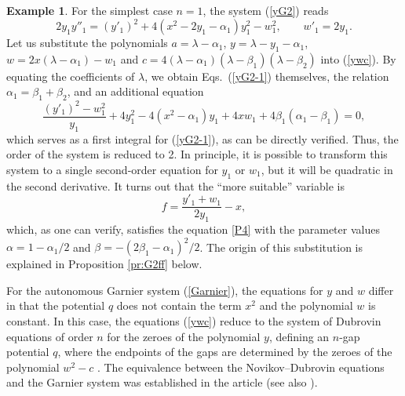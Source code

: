 \documentclass[11pt]{article}
\theoremstyle{plain}
\theoremstyle{definition}
\newtheorem{example}[proposition]{Example}
\begin{document}
\begin{example}\label{ex:P4} 
For the simplest case $n=1$, the system (\ref{yG2}) reads
\begin{equation}\label{yG2-1}
 2y_1y''_1=(y'_1)^2+4(x^2-2y_1-\alpha_1)y^2_1-w^2_1,\qquad w'_1=2y_1.
\end{equation}
Let us substitute the polynomials $a=\lambda-\alpha_1$, $y=\lambda-y_1-\alpha_1$, $w=2x(\lambda-\alpha_1)-w_1$ and $c=4(\lambda-\alpha_1)(\lambda-\beta_1)(\lambda-\beta_2)$ into (\ref{ywc}). By equating the coefficients of $\lambda$, we obtain Eqs.~(\ref{yG2-1}) themselves, the relation $\alpha_1=\beta_1+\beta_2$, and an additional equation
\[
 \frac{(y'_1)^2-w^2_1}{y_1}+4y^2_1-4(x^2-\alpha_1)y_1+4xw_1+4\beta_1(\alpha_1-\beta_1)=0,
\]
which serves as a first integral for (\ref{yG2-1}), as can be directly verified. Thus, the order of the system is reduced to 2. In principle, it is possible to transform this system to a single second-order equation for $y_1$ or $w_1$, but it will be quadratic in the second derivative. It turns out that the ``more suitable'' variable is
\[
 f=\frac{y'_1+w_1}{2y_1}-x,
\]
which, as one can verify, satisfies the equation \ref{P4} with the parameter values $\alpha=1-\alpha_1/2$ and $\beta=-(2\beta_1-\alpha_1)^2/2$. The origin of this substitution is explained in Proposition \ref{pr:G2ff} below.
\end{example} 

For the autonomous Garnier system (\ref {Garnier}), the equations for $y$ and $w$ differ in that the potential $q$ does not contain the term $x^2$ and the polynomial $w$ is constant. In this case, the equations (\ref {ywc}) reduce to the system of Dubrovin equations of order $n$ for the zeroes of the polynomial $y$, defining an $n$-gap potential $q$, where the endpoints of the gaps are determined by the zeroes of the polynomial $w^2-c$ \cite{Novikov_1974, Dubrovin_1975}. The equivalence between the Novikov--Dubrovin equations and the Garnier system was established in the article \cite{Choodnovsky_1978} (see also \cite[Chapter 22]{Suris_2003}).
\end{document}
